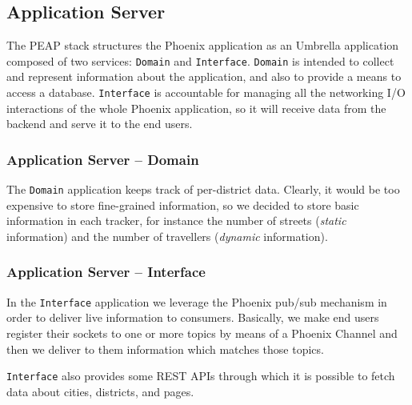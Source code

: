 \subsection{Application Server}\label{sec:sol-des-as}

The PEAP stack structures the Phoenix application as an Umbrella application
composed of two services: \texttt{Domain} and \texttt{Interface}.
\texttt{Domain} is intended to collect and represent information about the
application, and also to provide a means to access a database.
\texttt{Interface} is accountable for managing all the networking I/O
interactions of the whole Phoenix application, so it will receive data from the
backend and serve it to the end users.

\subsubsection{Application Server -- Domain}

The \texttt{Domain} application keeps track of per-district data.
Clearly, it would be too expensive to store fine-grained information, so we
decided to store basic information in each tracker, for instance the number of
streets (\textit{static} information) and the number of travellers
(\textit{dynamic} information).

\subsubsection{Application Server -- Interface}
In the \texttt{Interface} application we leverage the Phoenix pub/sub
mechanism in order to deliver live information to consumers.
Basically, we make end users register their sockets to one or more topics by
means of a Phoenix Channel and then we deliver to them information which
matches those topics.

\texttt{Interface} also provides some REST APIs through which it is possible to
fetch data about cities, districts, and pages.
